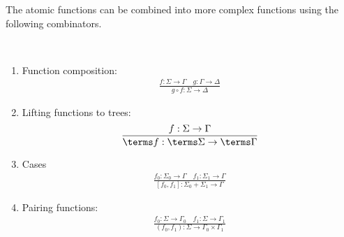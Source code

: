 \begin{definition}
\begin{enumerate}

\end{enumerate}
\end{definition}



The atomic functions can be combined into more complex functions using the following combinators.
\begin{definition}
     [Combinators] \label{def:combinators} \ 
    \begin{enumerate}
    \item Function composition:
    \begin{align*}
    \frac{f : \Sigma \to \Gamma \quad g : \Gamma \to \Delta} {g \circ f : \Sigma \to \Delta}
\end{align*}

\item Lifting functions to trees:
\begin{align*}
    \frac{f : \Sigma \to \Gamma} {\terms f : \terms \Sigma \to \terms \Gamma}
\end{align*}
\item Cases
\begin{align*}
    \frac{f_0 : \Sigma_0 \to \Gamma \quad f_1 : \Sigma_1 \to \Gamma} {[f_0,f_1] : \Sigma_0 + \Sigma_1 \to \Gamma}
\end{align*}

\item Pairing functions:
\begin{align*}
    \frac{f_0 : \Sigma \to \Gamma_0 \quad f_1 : \Sigma \to \Gamma_1} {(f_0,f_1) : \Sigma \to \Gamma_0 \times \Gamma_1}
\end{align*}

\end{enumerate}
\end{definition}

